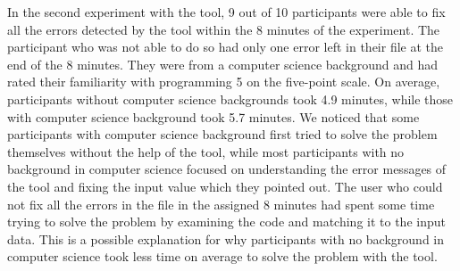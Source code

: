 \documentclass[10pt]{report}
\begin{document}
In the second experiment with the tool, 9 out of 10 participants were able to fix all the errors detected by the tool within the 8 minutes of the experiment. The participant who was not able to do so had only one error left in their file at the end of the 8 minutes. They were from a computer science background and had rated their familiarity with programming 5 on the five-point scale. On average, participants without computer science backgrounds took 4.9 minutes, while those with computer science background took 5.7 minutes. We noticed that some participants with computer science background first tried to solve the problem themselves without the help of the tool, while most participants with no background in computer science focused on understanding the error messages of the tool and fixing the input value which they pointed out. The user who could not fix all the errors in the file in the assigned 8 minutes had spent some time trying to solve the problem by examining the code and matching it to the input data. This is a possible explanation for why participants with no background in computer science took less time on average to solve the problem with the tool. 
\end{document}
